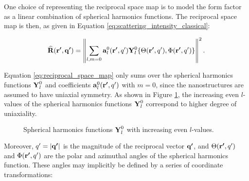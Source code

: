 
One choice of representing the reciprocal space map is to model the form factor as a linear combination of spherical harmonics functions.
The reciprocal space map is then,
as given in Equation \eqref{eq:scattering_intensity_classical}:

\begin{equation}\label{eq:reciprocal_space_map}
    \bm{\mathrm{\widehat{R}}}(\bm{\mathrm{r'}}, \bm{\mathrm{q'}}) = \left\| \sum_{l, m=0} \bm{\mathrm{a}}_{l}^{0}(\bm{\mathrm{r'}}, q') \bm{\mathrm{Y}}_{l}^{0} \{ \Theta(\bm{\mathrm{r'}}, q'), \Phi(\bm{\mathrm{r'}}, q') \} \right\|^{2}.
\end{equation}

Equation \eqref{eq:reciprocal_space_map} only sums over the spherical harmonics functions $\bm{\mathrm{Y}}_{l}^{0}$ and coefficients $\bm{\mathrm{a}}_{l}^{0}(\bm{\mathrm{r'}}, q')$ with $m=0$, since the nanostructures are assumed to have uniaxial symmetry.
As shown in Figure \ref{fig:spherical_harmonics}, the increasing even $l$-values of the spherical harmonics functions $\bm{\mathrm{Y}}_{l}^{0}$ correspond to higher degree of uniaxiality.

\begin{figure}[h!]
    \centering
    
    \caption{Spherical harmonics functions $\bm{\mathrm{Y}}_{l}^{0}$ with increasing even $l$-values.
    }
    \label{fig:spherical_harmonics}
\end{figure}


Moreover, $q' = |\bm{\mathrm{q'}}|$ is the magnitude of the reciprocal vector $\bm{\mathrm{q'}}$, and $\Theta(\bm{\mathrm{r'}}, q')$ and $\Phi(\bm{\mathrm{r'}}, q')$ are the polar and azimuthal angles of the spherical harmonics function.
These angles may implicitly be defined by a series of coordinate transformations:


